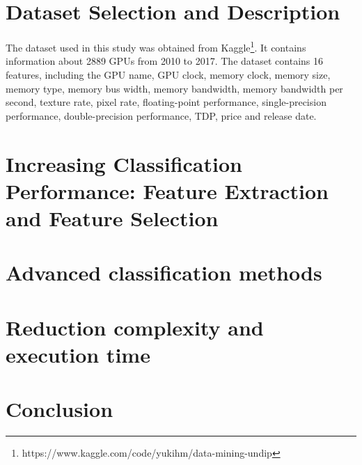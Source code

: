 \documentclass[conference,onecolumn]{IEEEtran}
\begin{document}
\section{Dataset Selection and Description}
The dataset used in this study was obtained from Kaggle\footnote{https://www.kaggle.com/code/yukihm/data-mining-undip}. It contains information about 2889 GPUs from 2010 to 2017. The dataset contains 16 features, including the GPU name, GPU clock, memory clock, memory size, memory type, memory bus width, memory bandwidth, memory bandwidth per second, texture rate, pixel rate, floating-point performance, single-precision performance, double-precision performance, TDP, price and release date.\\


\section{Increasing Classification Performance: Feature Extraction and Feature Selection}	
\section{Advanced classification methods}
\section{Reduction complexity and execution time}
\section{Conclusion}
\end{document}
